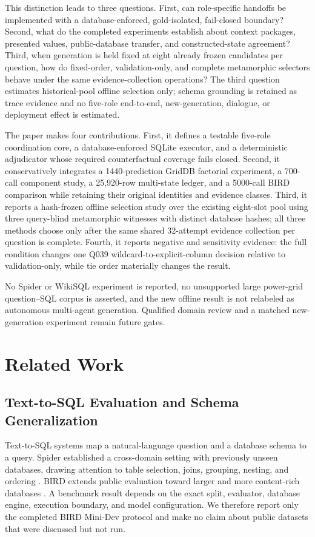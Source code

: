 \documentclass[applsci,article,submit,moreauthors]{Definitions/mdpi}
\begin{document}
This distinction leads to three questions. First, can role-specific handoffs be implemented with a database-enforced, gold-isolated, fail-closed boundary? Second, what do the completed experiments establish about context packages, presented values, public-database transfer, and constructed-state agreement? Third, when generation is held fixed at eight already frozen candidates per question, how do fixed-order, validation-only, and complete metamorphic selectors behave under the same evidence-collection operations? The third question estimates historical-pool offline selection only; schema grounding is retained as trace evidence and no five-role end-to-end, new-generation, dialogue, or deployment effect is estimated.

The paper makes four contributions. First, it defines a testable five-role coordination core, a database-enforced SQLite executor, and a deterministic adjudicator whose required counterfactual coverage fails closed. Second, it conservatively integrates a 1440-prediction GridDB factorial experiment, a 700-call component study, a 25,920-row multi-state ledger, and a 5000-call BIRD comparison while retaining their original identities and evidence classes. Third, it reports a hash-frozen offline selection study over the existing eight-slot pool using three query-blind metamorphic witnesses with distinct database hashes; all three methods choose only after the same shared 32-attempt evidence collection per question is complete. Fourth, it reports negative and sensitivity evidence: the full condition changes one Q039 wildcard-to-explicit-column decision relative to validation-only, while tie order materially changes the result.

No Spider or WikiSQL experiment is reported, no unsupported large power-grid question--SQL corpus is asserted, and the new offline result is not relabeled as autonomous multi-agent generation. Qualified domain review and a matched new-generation experiment remain future gates.

\section{Related Work}

\subsection{Text-to-SQL Evaluation and Schema Generalization}

Text-to-SQL systems map a natural-language question and a database schema to a query. Spider established a cross-domain setting with previously unseen databases, drawing attention to table selection, joins, grouping, nesting, and ordering \cite{yu2018spider}. BIRD extends public evaluation toward larger and more content-rich databases \cite{li2023bird}. A benchmark result depends on the exact split, evaluator, database engine, execution boundary, and model configuration. We therefore report only the completed BIRD Mini-Dev protocol and make no claim about public datasets that were discussed but not run.
\end{document}
